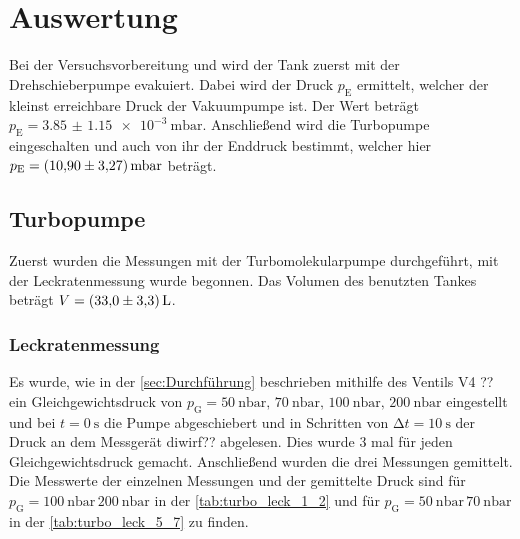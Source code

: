 \section{Auswertung}
\label{sec:Auswertung}

\noindent Bei der Versuchsvorbereitung und wird der Tank zuerst mit der Drehschieberpumpe evakuiert. Dabei wird der Druck $p_\text{E}$ ermittelt, welcher der kleinst erreichbare Druck 
der Vakuumpumpe ist. Der Wert beträgt $p_\text{E} = \SI{3.85(115)e-3}{\milli\bar}$. Anschließend wird die Turbopumpe eingeschalten und auch von ihr der Enddruck bestimmt, welcher hier 
$p_\text{E} = \SI{10.9 \pm 3.27}{\milli\bar}$ beträgt. 

\subsection{Turbopumpe}

  \noindent Zuerst wurden die Messungen mit der Turbomolekularpumpe durchgeführt, mit der Leckratenmessung wurde begonnen. Das Volumen des benutzten Tankes beträgt $V = \SI{33 \pm 3.3}{\litre}$. 
  
  \subsubsection{Leckratenmessung}

    \noindent Es wurde, wie in der \autoref{sec:Durchführung} beschrieben mithilfe des Ventils V4 ?? ein Gleichgewichtsdruck von $p_\text{G} = \SI{50}{\nano\bar}, \, \SI{70}{\nano\bar}, \,  \SI{100}{\nano\bar},\, \SI{200}{\nano\bar}$ eingestellt 
    und bei $t = \SI{0}{\second}$ die Pumpe abgeschiebert und in Schritten von $\increment t = \SI{10}{\second}$ der Druck an dem Messgerät diwirf?? abgelesen. Dies wurde 3 mal für jeden 
    Gleichgewichtsdruck gemacht. Anschließend wurden die drei Messungen gemittelt. Die Messwerte der einzelnen Messungen und der gemittelte Druck sind für $p_\text{G} = \SI{100}{\nano\bar}\, \SI{200}{\nano\bar}$
    in der \autoref{tab:turbo_leck_1_2} und für $p_\text{G} = \SI{50}{\nano\bar}\, \SI{70}{\nano\bar}$ in der \autoref{tab:turbo_leck_5_7} zu finden. 

